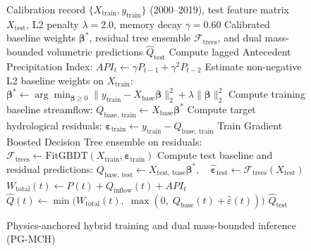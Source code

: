 \documentclass[11pt,a4paper,fleqn]{article}
\begin{document}
\begin{figure}[htbp]
\begin{algorithm}[htbp]
\caption{Physics-anchored hybrid training and dual mass-bounded inference (PG-MCH)}
\label{alg:pgmch}
\begin{algorithmic}[1]
\REQUIRE Calibration record $\{X_{\text{train}}, y_{\text{train}}\}$ (2000--2019), test feature matrix $X_{\text{test}}$, L2 penalty $\lambda = 2.0$, memory decay $\gamma = 0.60$
\ENSURE Calibrated baseline weights $\boldsymbol{\beta}^*$, residual tree ensemble $\mathcal{F}_{\text{trees}}$, and dual mass-bounded volumetric predictions $\hat{Q}_{\text{test}}$
\STATE Compute lagged Antecedent Precipitation Index: $API_t \leftarrow \gamma P_{t-1} + \gamma^2 P_{t-2}$
\STATE Estimate non-negative L2 baseline weights on $X_{\text{train}}$:
\STATE $\boldsymbol{\beta}^* \leftarrow \arg\min_{\boldsymbol{\beta} \ge 0} \|y_{\text{train}} - X_{\text{base}}\boldsymbol{\beta}\|_2^2 + \lambda \|\boldsymbol{\beta}\|_2^2$
\STATE Compute training baseline streamflow: $Q_{\text{base, train}} \leftarrow X_{\text{base}}\boldsymbol{\beta}^*$
\STATE Compute target hydrological residuals: $\boldsymbol{\varepsilon}_{\text{train}} \leftarrow y_{\text{train}} - Q_{\text{base, train}}$
\STATE Train Gradient Boosted Decision Tree ensemble on residuals:
\STATE $\mathcal{F}_{\text{trees}} \leftarrow \text{FitGBDT}(X_{\text{train}}, \boldsymbol{\varepsilon}_{\text{train}})$
\STATE Compute test baseline and residual predictions:
\STATE $Q_{\text{base, test}} \leftarrow X_{\text{test, base}}\boldsymbol{\beta}^*,\quad \hat{\boldsymbol{\varepsilon}}_{\text{test}} \leftarrow \mathcal{F}_{\text{trees}}(X_{\text{test}})$
    \STATE $W_{\text{total}}(t) \leftarrow P(t) + Q_{\text{inflow}}(t) + API_t$
    \STATE $\hat{Q}(t) \leftarrow \min\Big(W_{\text{total}}(t), \; \max\left(0, \; Q_{\text{base}}(t) + \hat{\varepsilon}(t)\right)\Big)$
\ENDFOR
\RETURN $\hat{Q}_{\text{test}}$
\end{algorithmic}
\end{algorithm}


\end{figure}
\end{document}
